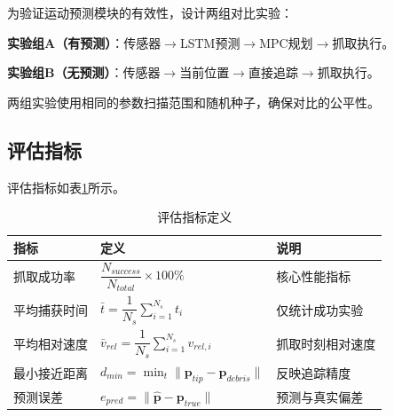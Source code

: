 \documentclass[12pt,a4paper]{ctexart}
\begin{document}
为验证运动预测模块的有效性，设计两组对比实验：

\textbf{实验组A（有预测）}：传感器$\to$LSTM预测$\to$MPC规划$\to$抓取执行。

\textbf{实验组B（无预测）}：传感器$\to$当前位置$\to$直接追踪$\to$抓取执行。

两组实验使用相同的参数扫描范围和随机种子，确保对比的公平性。

\subsection{评估指标}

评估指标如表\ref{tab:metrics}所示。

\begin{table}[H]
\centering
\caption{评估指标定义}
\label{tab:metrics}
\begin{tabular}{lll}
\toprule
指标 & 定义 & 说明 \\
\midrule
抓取成功率 & $\dfrac{N_{success}}{N_{total}} \times 100\%$ & 核心性能指标 \\[8pt]
平均捕获时间 & $\bar{t} = \dfrac{1}{N_s}\sum_{i=1}^{N_s} t_i$ & 仅统计成功实验 \\[8pt]
平均相对速度 & $\bar{v}_{rel} = \dfrac{1}{N_s}\sum_{i=1}^{N_s} v_{rel,i}$ & 抓取时刻相对速度 \\[8pt]
最小接近距离 & $d_{min} = \min_t \|\mathbf{p}_{tip} - \mathbf{p}_{debris}\|$ & 反映追踪精度 \\[8pt]
预测误差 & $e_{pred} = \|\hat{\mathbf{p}} - \mathbf{p}_{true}\|$ & 预测与真实偏差 \\
\bottomrule
\end{tabular}
\end{table}
\end{document}
